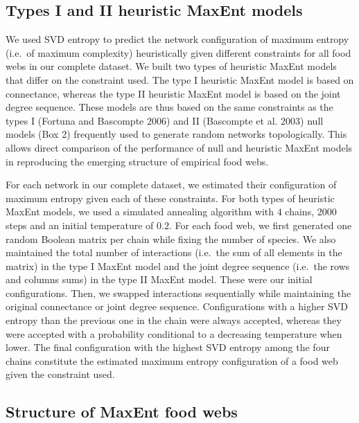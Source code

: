 \documentclass[10pt,oneside]{article}
\begin{document}
\hypertarget{types-i-and-ii-heuristic-maxent-models}{%
\subsection{Types I and II heuristic MaxEnt
models}\label{types-i-and-ii-heuristic-maxent-models}}

We used SVD entropy to predict the network configuration of maximum
entropy (i.e.~of maximum complexity) heuristically given different
constraints for all food webs in our complete dataset. We built two
types of heuristic MaxEnt models that differ on the constraint used. The
type I heuristic MaxEnt model is based on connectance, whereas the type
II heuristic MaxEnt model is based on the joint degree sequence. These
models are thus based on the same constraints as the types I (Fortuna
and Bascompte 2006) and II (Bascompte et al. 2003) null models (Box 2)
frequently used to generate random networks topologically. This allows
direct comparison of the performance of null and heuristic MaxEnt models
in reproducing the emerging structure of empirical food webs.

For each network in our complete dataset, we estimated their
configuration of maximum entropy given each of these constraints. For
both types of heuristic MaxEnt models, we used a simulated annealing
algorithm with \(4\) chains, \(2000\) steps and an initial temperature
of \(0.2\). For each food web, we first generated one random Boolean
matrix per chain while fixing the number of species. We also maintained
the total number of interactions (i.e.~the sum of all elements in the
matrix) in the type I MaxEnt model and the joint degree sequence
(i.e.~the rows and columns sums) in the type II MaxEnt model. These were
our initial configurations. Then, we swapped interactions sequentially
while maintaining the original connectance or joint degree sequence.
Configurations with a higher SVD entropy than the previous one in the
chain were always accepted, whereas they were accepted with a
probability conditional to a decreasing temperature when lower. The
final configuration with the highest SVD entropy among the four chains
constitute the estimated maximum entropy configuration of a food web
given the constraint used.

\hypertarget{structure-of-maxent-food-webs}{%
\subsection{Structure of MaxEnt food
webs}\label{structure-of-maxent-food-webs}}
\end{document}
